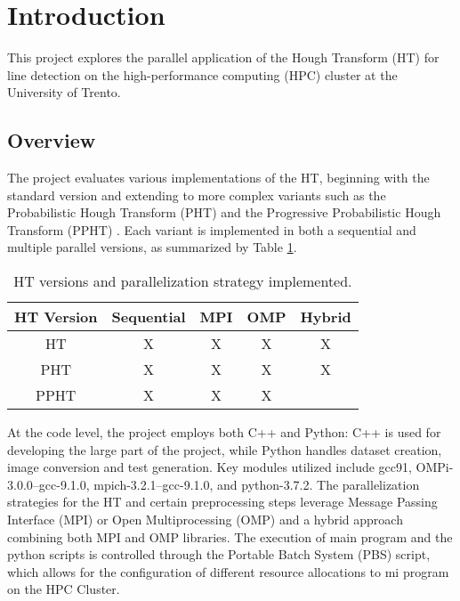 \documentclass[conference]{IEEEtran}
\title{}
\author{
    \IEEEauthorblockN{Luca Zanolo}
    \IEEEauthorblockA{ \textit{luca.zanolo@studenti.unitn.it}\\
    \textit{University of Trento} \\
    Trento, Italy}
}
\begin{document}
\maketitle

\section{Introduction}
\label{sec:intro}

    This project explores the parallel application of the Hough Transform (HT) for line detection on the high-performance computing (HPC) cluster at the University of Trento.
    
    \subsection{Overview}
        \label{sec:intro_overview}
        The project evaluates various implementations of the HT, beginning with the standard version \cite{HT} and extending to more complex variants such as the Probabilistic Hough Transform (PHT) \cite{PHT} and the Progressive Probabilistic Hough Transform (PPHT) \cite{PPHT}. Each variant is implemented in both a sequential and multiple parallel versions, as summarized by Table \ref{tab:ht_version_parallelization}.
        
        \begin{table}[ht]
        \centering
        \caption{HT versions and parallelization strategy implemented.}
        \label{tab:ht_version_parallelization}
        \begin{tabular}{|c|c|c|c|c|}
        \hline
        \textbf{HT Version} & \textbf{Sequential} & \textbf{MPI} & \textbf{OMP} & \textbf{Hybrid} \\ \hline
        HT     & X & X & X & X  \\ \hline
        PHT    & X & X & X & X  \\ \hline
        PPHT   & X & X & X &   \\ \hline
        \end{tabular}
        \end{table}

        At the code level, the project employs both C++ and Python: C++ is used for developing the large part of the project, while Python handles dataset creation, image conversion and test generation. Key modules utilized include gcc91, OMPi-3.0.0--gcc-9.1.0, mpich-3.2.1--gcc-9.1.0, and python-3.7.2. The parallelization strategies for the HT and certain preprocessing steps leverage Message Passing Interface (MPI) or Open Multiprocessing (OMP) and a hybrid approach combining both MPI and OMP libraries.
        The execution of main program and the python scripts is controlled through the Portable Batch System (PBS) script, which allows for the configuration of different resource allocations to mi program on the HPC Cluster.
        
\end{document}
